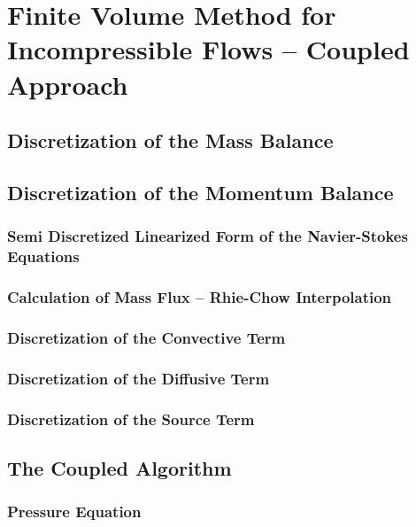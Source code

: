   \section{Finite Volume Method for Incompressible Flows -- Coupled Approach}

    \subsection{Discretization of the Mass Balance}

    \subsection{Discretization of the Momentum Balance}
      
      \subsubsection{Semi Discretized Linearized Form of the Navier-Stokes Equations}

      \subsubsection{Calculation of Mass Flux -- Rhie-Chow Interpolation}

      \subsubsection{Discretization of the Convective Term}

      \subsubsection{Discretization of the Diffusive Term}

      \subsubsection{Discretization of the Source Term}

    \subsection{The Coupled Algorithm}
      
      \subsubsection{Pressure Equation}

